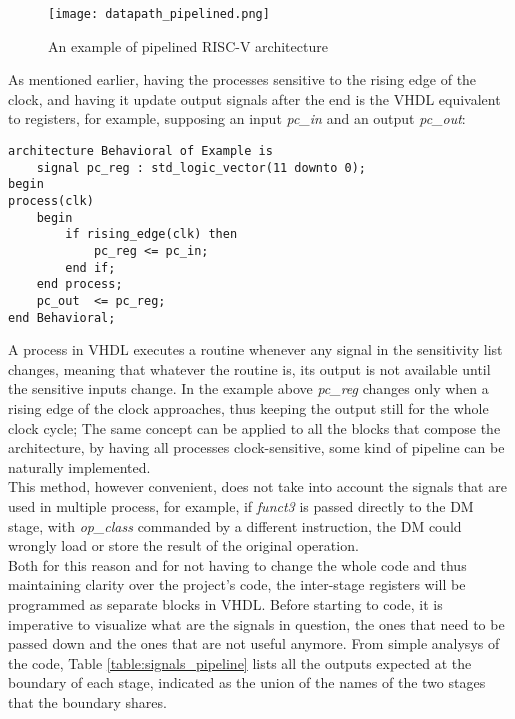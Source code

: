 \begin{figure}[!ht]
    \centering
    \texttt{[image: datapath\_pipelined.png]}
    \caption{An example of pipelined RISC-V architecture}
    \label{fig:DP_PPL}
\end{figure}

As mentioned earlier, having the processes sensitive to the rising edge of the clock, and having it update output signals after the end is the VHDL equivalent to registers, for example, supposing an input \emph{pc{\_}in} and an output \emph{pc{\_}out}:  

\begin{verbatim}
architecture Behavioral of Example is
    signal pc_reg : std_logic_vector(11 downto 0);
begin
process(clk)
    begin
        if rising_edge(clk) then
            pc_reg <= pc_in;
        end if;
    end process;
    pc_out  <= pc_reg;
end Behavioral;
\end{verbatim}

A process in VHDL executes a routine whenever any signal in the sensitivity list changes, meaning that whatever the routine is, its output is not available until the sensitive inputs change. In the example above \emph{pc{\_}reg} changes only when a rising edge of the clock approaches, thus keeping the output still for the whole clock cycle; The same concept can be applied to all the blocks that compose the architecture, by having all processes clock-sensitive, some kind of pipeline can be naturally implemented.\\
This method, however convenient, does not take into account the signals that are used in multiple process, for example, if \emph{funct3} is passed directly to the DM stage, with \emph{op{\_}class} commanded by a different instruction, the DM could wrongly load or store the result of the original operation.\\
Both for this reason and for not having to change the whole code and thus maintaining clarity over the project's code, the inter-stage registers will be programmed as separate blocks in VHDL. Before starting to code, it is imperative to visualize what are the signals in question, the ones that need to be passed down and the ones that are not useful anymore. 
From simple analysys of the code, Table \ref{table:signals_pipeline} lists all the outputs expected at the boundary of each stage, indicated as the union of the names of the two stages that the boundary shares.

